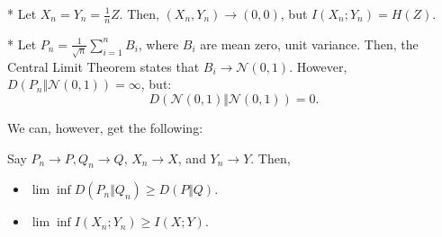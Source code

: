 \begin{exm}*
	Let $X_n = Y_n = \frac 1n Z$. Then, $(X_n,Y_n)\to (0,0)$, but $I(X_n;Y_n) = H(Z)$.
\end{exm}

\begin{exm}*
	Let $P_n = \frac 1{\sqrt n} \sum\limits_{i=1}^n B_i$, where $B_i$ are mean zero, unit variance. Then, the Central Limit Theorem states that $B_i \to \mathcal N(0,1)$. However, $D(P_n\Vert\mathcal N(0,1)) = \infty$, but: \[
		D(\mathcal N(0,1)\Vert \mathcal N(0,1)) = 0.
	\]
\end{exm}

We can, however, get the following:

\begin{fact}
	Say $P_n \to P, Q_n\to Q$, $X_n\to X$, and $Y_n\to Y$. Then, \begin{itemize}
		\item $\lim \inf D(P_n\Vert Q_n) \geq D(P\Vert Q)$.
		\item $\lim \inf I(X_n;Y_n)\geq I(X;Y)$.
	\end{itemize}
\end{fact}
